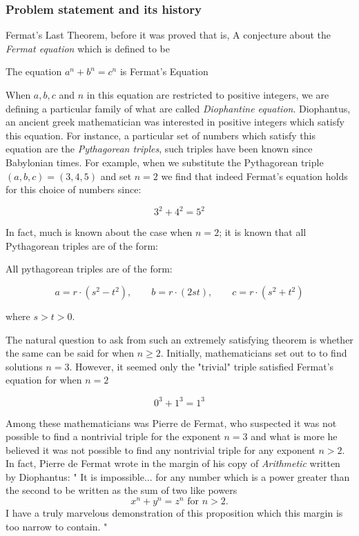 \subsubsection{Problem statement and its history}
Fermat's Last Theorem, before it was proved that is, A conjecture about the \textit{Fermat equation} which is defined to be

\begin{definition}
    The equation $a^n + b^n = c^n$ is Fermat's Equation
\end{definition}

When $a, b, c$ and $n$ in this equation are restricted to positive integers, we are defining a particular family of what are called \textit{Diophantine equation}.
Diophantus, an ancient greek mathematician was interested in positive integers which satisfy this equation. For instance, a particular set of numbers which satisfy this equation 
are the \textit{Pythagorean triples}, such triples have been known since Babylonian times. For example, when we substitute the Pythagorean triple $(a,b,c) = (3,4,5)$ and set $n = 2$ we find that 
indeed Fermat's equation holds for this choice of numbers since:

\[
3^2 + 4^2 = 5^2
\]

In fact, much is known about the case when $n = 2$; it is known that all Pythagorean triples are of the form:

\begin{theorem}
    All pythagorean triples are of the form:

    \[
    a = r \cdot (s^2 - t^2), \qquad b = r \cdot (2st), \qquad c = r \cdot (s^2 + t^2)
    \]

    where $s > t > 0$.
\end{theorem}

The natural question to ask from such an extremely satisfying theorem is whether the same can be said for when $n \ge 2$. Initially, mathematicians set out to
to find solutions $n = 3$. However, it seemed only the "trivial" triple satisfied Fermat's equation for when $n = 2$

\[
0^3 + 1^3 = 1^3
\]

Among these mathematicians was Pierre de Fermat, who suspected it was not possible to find a nontrivial triple for the exponent $n= 3$ and what is more he believed
it was not possible to find any nontrivial triple for any exponent $n > 2$. In fact, Pierre de Fermat wrote in the margin of his copy of \textit{Arithmetic} written by Diophantus:
"
It is impossible... for any number which is a power greater than the second to be written as the sum of two like powers 
\[ 
x^n + y^n = z^n \text{ for } n > 2.
\]
I have a truly marvelous demonstration of this proposition which this margin is too narrow to contain.
"

